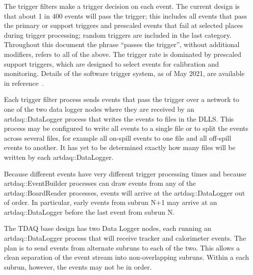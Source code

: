 
The trigger filters make a trigger decision on each event.
The current design is that about 1 in 400 events will pass the trigger;
this includes all events that pass the primary or support triggers
and prescaled events that fail at selected places during trigger processing;
random triggers are included in the last category.
Throughout this document the phrase ``passes the trigger'', without additional modifiers,
refers to all of the above.
The trigger rate is dominated by prescaled support triggers,
which are designed to select events for calibration and monitoring.
Details of the software trigger system, as of May 2021,
are available in reference~\cite{TriggerSU2020}.


Each \art trigger filter process sends events that pass the trigger over a network
to one of the two data logger nodes where they are received by an {\code artdaq::DataLogger} process
that writes the events to files in the DLLS.
This process may be configured to write all events to a single file
or to split the events across several files,
for example all on-spill events to one file and all off-spill events to another.
It has yet to be determined exactly how many files will be written
by each {\code artdaq::DataLogger}.

Because different events have very different trigger processing times
and because {\code artdaq::EventBuilder} processes can draw events from
any of the {\code artdaq::BoardReader} processes, events will arrive at the
{\code artdaq::DataLogger} out of order.  In particular, early events from subrun N+1
may arrive at an {\code artdaq::DataLogger} before the last event from subrun N.

The TDAQ base design has two Data Logger nodes, each running an
{\code artdaq::DataLogger} process that will receive tracker and calorimeter events.
The plan is to send events from alternate subruns to each of the two.
This allows a clean separation of the event stream into non-overlapping subruns.
Within a each subrun, however, the events may not be in order.

